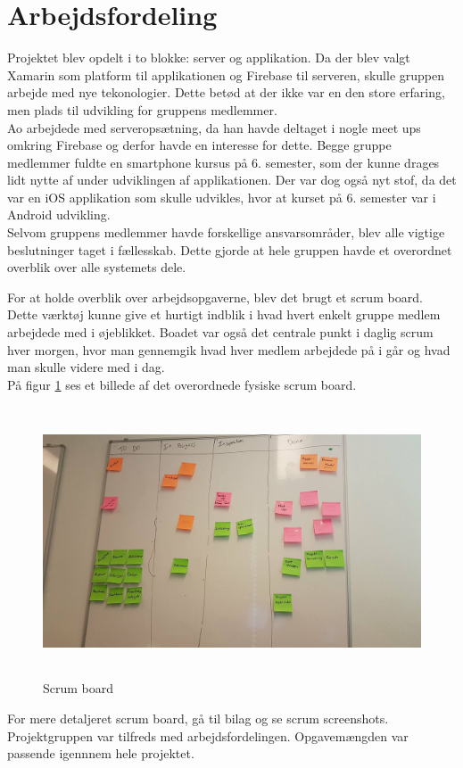 \section{Arbejdsfordeling}
Projektet blev opdelt i to blokke: server og applikation. Da der blev valgt Xamarin som platform til applikationen og Firebase til serveren, skulle gruppen arbejde med nye tekonologier. Dette betød at der ikke var en den store erfaring, men plads til udvikling for gruppens medlemmer. \\
Ao arbejdede med serveropsætning, da han havde deltaget i nogle meet ups omkring Firebase og derfor havde en interesse for dette. Begge gruppe medlemmer fuldte en smartphone kursus på 6. semester, som der kunne drages lidt nytte af under udviklingen af applikationen. Der var dog også nyt stof, da det var en iOS applikation som skulle udvikles, hvor at kurset på 6. semester var i Android udvikling. \\
Selvom gruppens medlemmer havde forskellige ansvarsområder, blev alle vigtige beslutninger taget i fællesskab. Dette gjorde at hele gruppen havde et overordnet overblik over alle systemets dele.

For at holde overblik over arbejdsopgaverne, blev det brugt et scrum board. Dette værktøj kunne give et hurtigt indblik i hvad hvert enkelt gruppe medlem arbejdede med i øjeblikket. Boadet var også det centrale punkt i daglig scrum hver morgen, hvor man gennemgik hvad hver medlem arbejdede på i går og hvad man skulle videre med i dag. \\
På figur \ref{fig:Scrumboard} ses et billede af det overordnede fysiske scrum board.

\begin{figure} [H]
	\begin{center}
		\includegraphics[height=8cm, width=12cm]{Arbejdsfordeling/ScrumBoard}
	\end{center}
	\caption{Scrum board}
	\label{fig:Scrumboard}
\end{figure}

For mere detaljeret scrum board, gå til bilag og se scrum screenshots. \\
Projektgruppen var tilfreds med arbejdsfordelingen. Opgavemængden var passende igennnem hele projektet. \\